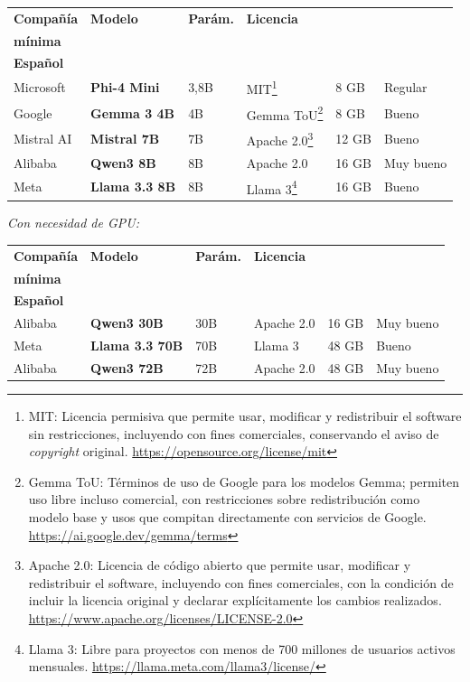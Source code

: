 \documentclass[
  spanish,
]{article}
\begin{document}
\begin{center}
{\renewcommand{\arraystretch}{1.3}
\begin{tabular*}{\linewidth}{@{\extracolsep{\fill}}llllll@{}}
\toprule
\textbf{Compañía} & \textbf{Modelo} & \textbf{Parám.} & \textbf{Licencia} & \makecell[l]{\textbf{RAM}\\\textbf{mínima}} & \makecell[l]{\textbf{Manejo de}\\\textbf{Español}} \\
\midrule
Microsoft  & \textbf{Phi-4 Mini}   & 3,8B & MIT\footnote{MIT: Licencia permisiva que permite usar, modificar y redistribuir el software sin restricciones, incluyendo con fines comerciales, conservando el aviso de \emph{copyright} original. \url{https://opensource.org/license/mit}}        & 8 GB  & Regular   \\
Google     & \textbf{Gemma 3 4B}   & 4B   & Gemma ToU\footnote{Gemma ToU: Términos de uso de Google para los modelos Gemma; permiten uso libre incluso comercial, con restricciones sobre redistribución como modelo base y usos que compitan directamente con servicios de Google. \url{https://ai.google.dev/gemma/terms}}  & 8 GB  & Bueno     \\
Mistral AI & \textbf{Mistral 7B}   & 7B   & Apache 2.0\footnote{Apache 2.0: Licencia de código abierto que permite usar, modificar y redistribuir el software, incluyendo con fines comerciales, con la condición de incluir la licencia original y declarar explícitamente los cambios realizados. \url{https://www.apache.org/licenses/LICENSE-2.0}} & 12 GB & Bueno     \\
Alibaba    & \textbf{Qwen3 8B}     & 8B   & Apache 2.0              & 16 GB & Muy bueno \\
Meta       & \textbf{Llama 3.3 8B} & 8B   & Llama 3\footnote{Llama 3: Libre para proyectos con menos de 700 millones de usuarios activos mensuales. \url{https://llama.meta.com/llama3/license/}}    & 16 GB & Bueno \\
\bottomrule
\end{tabular*}}
\end{center}

\medskip
\noindent\textit{Con necesidad de GPU:}

\begin{center}
{\renewcommand{\arraystretch}{1.3}
\begin{tabular*}{\linewidth}{@{\extracolsep{\fill}}llllll@{}}
\toprule
\textbf{Compañía} & \textbf{Modelo} & \textbf{Parám.} & \textbf{Licencia} & \makecell[l]{\textbf{VRAM}\\\textbf{mínima}} & \makecell[l]{\textbf{Manejo de}\\\textbf{Español}} \\
\midrule
Alibaba & \textbf{Qwen3 30B}     & 30B & Apache 2.0 & 16 GB & Muy bueno \\
Meta    & \textbf{Llama 3.3 70B} & 70B & Llama 3    & 48 GB & Bueno     \\
Alibaba & \textbf{Qwen3 72B}     & 72B & Apache 2.0 & 48 GB & Muy bueno \\
\bottomrule
\end{tabular*}}
\end{center}
\end{document}

